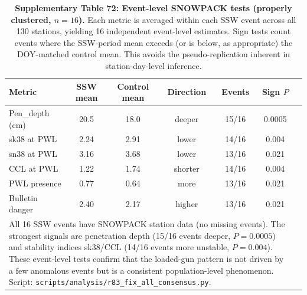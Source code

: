 \documentclass[11pt,letterpaper]{article}
\begin{document}
\begin{table}[!ht]
\centering
\caption{\textbf{Supplementary Table 72: Event-level SNOWPACK tests (properly clustered, $n = 16$).}
Each metric is averaged within each SSW event across all 130 stations, yielding 16 independent event-level estimates. Sign tests count events where the SSW-period mean exceeds (or is below, as appropriate) the DOY-matched control mean. This avoids the pseudo-replication inherent in station-day-level inference.}
\label{tab:event_level_snowpack}
\small
\begin{tabular}{lcccccc}
\toprule
Metric & SSW mean & Control mean & Direction & Events & Sign $P$ \\
\midrule
Pen\_depth (cm) & 20.5 & 18.0 & deeper & 15/16 & 0.0005 \\
sk38 at PWL & 2.24 & 2.91 & lower & 14/16 & 0.004 \\
sn38 at PWL & 3.16 & 3.68 & lower & 13/16 & 0.021 \\
CCL at PWL & 1.22 & 1.74 & shorter & 14/16 & 0.004 \\
PWL presence & 0.77 & 0.64 & more & 13/16 & 0.021 \\
Bulletin danger & 2.40 & 2.17 & higher & 13/16 & 0.021 \\
\bottomrule
\multicolumn{6}{p{14cm}}{\footnotesize All 16 SSW events have SNOWPACK station data (no missing events). The strongest signals are penetration depth (15/16 events deeper, $P = 0.0005$) and stability indices sk38/CCL (14/16 events more unstable, $P = 0.004$). These event-level tests confirm that the loaded-gun pattern is not driven by a few anomalous events but is a consistent population-level phenomenon. Script: \texttt{scripts/analysis/r83\_fix\_all\_consensus.py}.} \\
\end{tabular}
\end{table}
\end{document}
